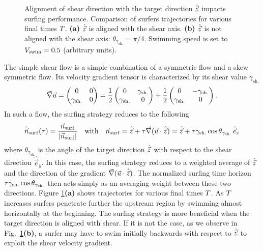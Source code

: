 \begin{figure}%
	\centering
	
	\caption[Alignment of shear direction with the target direction $\Direction$ impacts surfing performance.]{
		Alignment of shear direction with the target direction $\Direction$ impacts surfing performance.
		Comparison of surfers trajectories for various final times $T$.
		\textbf{(a)} $\Direction$ is aligned with the shear axis.
		\textbf{(b)} $\Direction$ is not aligned with the shear axis: $\theta_{\gamma_{\mathrm{sh.}}} = \pi/4$. 
		Swimming speed is set to $V_{\mathrm{swim}} = 0.5$ (arbitrary units).
	}
	\label{fig:simple_shear_surf}
\end{figure}
The simple shear flow is a simple combination of a symmetric flow and a skew symmetric flow. 
Its velocity gradient tensor is characterized by its shear value $\gamma_{\mathrm{sh.}}$
\begin{equation}\label{eq:taylor_green_vortex_velocity}
	\vec{\nabla} \vec{u} =
	\begin{pmatrix}
		0 & 0 \\
		\gamma_{\mathrm{sh.}} & 0
	\end{pmatrix} = \frac{1}{2}
	\begin{pmatrix}
		0 & \gamma_{\mathrm{sh.}} \\
		\gamma_{\mathrm{sh.}} & 0
	\end{pmatrix} + \frac{1}{2}
	\begin{pmatrix}
		0 & -\gamma_{\mathrm{sh.}} \\
		\gamma_{\mathrm{sh.}} & 0
	\end{pmatrix}.
\end{equation}
In such a flow, the surfing strategy reduces to the following
\begin{equation}
	\label{eq:optimal_swimming_direction_partial_asym}
	\hat{\vec{n}}_{\mathrm{surf}}(\tau) = \frac{\vec{n}_{\mathrm{surf}}}{\lvert\vec{n}_{\mathrm{surf}}\rvert} \quad \text{with} \quad \vec{n}_{\mathrm{surf}} = \hat{\vec{z}} + \tau \vec{\nabla} (\vec{u} \cdot \hat{\vec{z}}) = \hat{\vec{z}} + \tau \gamma_{\mathrm{sh.}} \cos \theta_{\gamma_{\mathrm{sh.}}} \, \hat{\vec{e}}_x
\end{equation}
where $\theta_{\gamma_{\mathrm{sh.}}}$ is the angle of the target direction $\Direction$ with respect to the shear direction $\hat{\vec{e}}_y$.
In this case, the surfing strategy reduces to a weighted average of $\Direction$ and the direction of the gradient $\vec{\nabla} (\vec{u} \cdot \hat{\vec{z}})$. 
The normalized surfing time horizon $\tau \gamma_{\mathrm{sh.}} \cos \theta_{\gamma_{\mathrm{sh.}}}$ then acts simply as an averaging weight between these two directions.
Figure \ref{fig:simple_shear_surf}\textbf{(a)}  shows trajectories for various final times $T$.
As $T$ increases surfers penetrate further the upstream region by swimming almost horizontally at the beginning.
The surfing strategy is more beneficial when the target direction is aligned with shear.
If it is not the case, as we observe in Fig.~\ref{fig:simple_shear_surf}\textbf{(b)}, a surfer may have to swim initially backwards with respect to $\Direction$ to exploit the shear velocity gradient.

